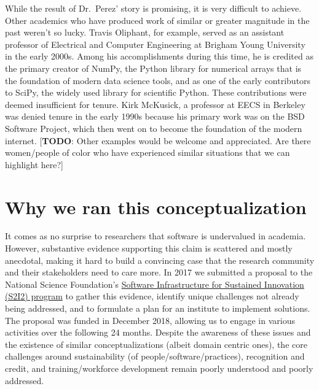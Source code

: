 \documentclass[
]{book}
\begin{document}
While the result of Dr.~Perez' story is promising, it is very difficult to achieve. Other
academics who have produced work of similar or greater magnitude in the past weren't so lucky.
Travis Oliphant, for example, served as an assistant professor of Electrical and Computer
Engineering at Brigham Young University in the early 2000s. Among his accomplishments
during this time, he is credited as the primary creator of NumPy, the Python library for
numerical arrays that is the foundation of modern data science tools, and as one of the
early contributors to SciPy, the widely used library for scientific Python. These
contributions were deemed insufficient for tenure. Kirk McKusick, a professor at EECS
in Berkeley was denied tenure in the early 1990s because his primary work was on the
BSD Software Project, which then went on to become the foundation of the modern internet.
{[}\textbf{TODO}: Other examples would be welcome and appreciated. Are there women/people of
color who have experienced similar situations that we can highlight here?{]}

\hypertarget{why-we-ran-this-conceptualization}{%
\section{Why we ran this conceptualization}\label{why-we-ran-this-conceptualization}}

It comes as no surprise to researchers that software is undervalued in academia.
However, substantive evidence supporting this claim is scattered and mostly anecdotal,
making it hard to build a convincing case that the research community and their
stakeholders need to care more. In 2017 we submitted a proposal to the National
Science Foundation's \href{https://www.nsf.gov/pubs/2015/nsf15553/nsf15553.htm}{Software Infrastructure for Sustained Innovation (S2I2) program}
to gather this evidence, identify unique challenges not already being addressed, and
to formulate a plan for an institute to implement solutions. The proposal was funded
in December 2018, allowing us to engage in various activities over the following 24 months.
Despite the awareness of these issues and the existence of similar conceptualizations
(albeit domain centric ones), the core challenges around sustainability (of
people/software/practices), recognition and credit, and training/workforce development
remain poorly understood and poorly addressed.
\end{document}
